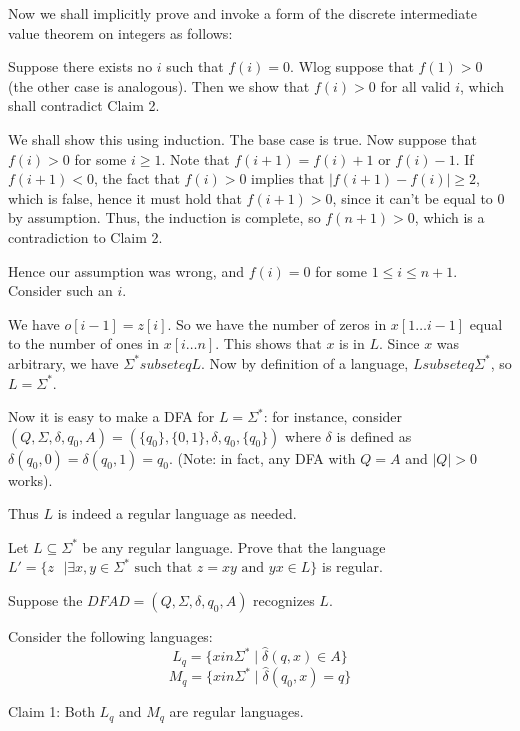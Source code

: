 \documentclass[answers]{exam}
\newcommand{\hd}{\hat{\delta}}
\begin{document}
\begin{questions}
\begin{solution}
        Now we shall implicitly prove and invoke a form of the discrete intermediate value theorem on integers as follows:

        Suppose there exists no $i$ such that $f(i) = 0$. Wlog suppose that $f(1) > 0$ (the other case is analogous). Then we show that $f(i) > 0$ for all valid $i$, which shall contradict Claim 2.

        We shall show this using induction. The base case is true. Now suppose that $f(i) > 0$ for some $i \ge 1$. Note that $f(i + 1) = f(i) + 1$ or $f(i) - 1$. If $f(i + 1) < 0$, the fact that $f(i)
        > 0$ implies that $|f(i + 1) - f(i)| \ge 2$, which is false, hence it must hold that $f(i + 1) > 0$, since it can't be equal to $0$ by assumption. Thus, the induction is complete, so $f(n + 1)
        > 0$, which is a contradiction to Claim 2.

        Hence our assumption was wrong, and $f(i) = 0$ for some $1 \le i \le n + 1$. Consider such an $i$.

        We have $o[i - 1] = z[i]$. So we have the number of zeros in $x[1 \ldots i - 1]$ equal to the number of ones in $x[i \ldots n]$. This shows that $x$ is in $L$. Since $x$ was arbitrary, we have
        $\Sigma^* subseteq L$. Now by definition of a language, $L subseteq \Sigma^*$, so $L = \Sigma^*$.

        Now it is easy to make a DFA for $L = \Sigma^*$: for instance, consider $(Q, \Sigma, \delta, q_0, A) = (\{q_0\}, \{0, 1\}, \delta, q_0, \{q_0\})$ where $\delta$ is defined as $\delta(q_0, 0)
        = \delta(q_0, 1) = q_0$. (Note: in fact, any DFA with $Q = A$ and $|Q| > 0$ works).

        Thus $L$ is indeed a regular language as needed.
    \end{solution}

    \question[6]
    Let $L\subseteq\Sigma^*$ be any regular language. Prove that the language $L'=\{z\text{ }|\exists x,y\in\Sigma^*\text{ such that }z=xy\text{ and }yx\in L\}$ is regular.

    \begin{solution}
        Suppose the $DFA D = (Q, \Sigma, \delta, q_0, A)$ recognizes $L$.

        Consider the following languages:
        \[
            L_q = \{x in \Sigma^* \mid \hd(q, x) \in A\}
        \]
        \[
            M_q = \{x in \Sigma^* \mid \hd(q_0, x) = q\}
        \]

        Claim 1: Both $L_q$ and $M_q$ are regular languages.


\end{solution}
\end{questions}
\end{document}
